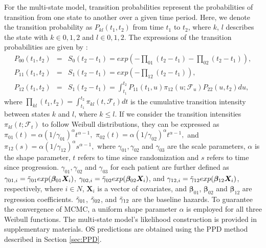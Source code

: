 \documentclass[aoas]{imsart}
\theoremstyle{plain}
\theoremstyle{remark}
\begin{document}
For the multi-state model, transition probabilities represent the probabilities of transition from one state to another over a given time period. Here, we denote the transition probability as $P_{kl}(t_1, t_2)$ from time $t_1$ to $t_2$, where $k$, $l$ describes the state with $k \in {0, 1, 2}$ and $l \in {0, 1, 2}$. The expressions of the transition probabilities are given by \citep{meira2009multi}:
\begin{eqnarray*}
P_{00}(t_1, t_2) &=& S_0(t_2 - t_1) = exp{(-\prod_{01}(t_2 - t_1) - \prod_{02}(t_2 - t_1))},\\
P_{11}(t_1, t_2) &=& S_1(t_2 - t_1) = exp{(-\prod_{12}(t_2 - t_1))},\\
P_{12}(t_1, t_2) &=& S_1(t_2 - t_1) = \int_{t_1}^{t_2}P_{11}(t_1, u) \pi_{12}(u;\mathcal{F}_u)P_{22}(u, t_2)du,
\end{eqnarray*}
where $\prod_{kl}(t_1, t_2)=\int_{t_1}^{t_2}\pi_{kl}(t, \mathcal{F}_t)dt$ is the cumulative transition intensity between states $k$ and $l$, where $k \leq l$. If we consider the transition intensities $\pi_{kl}(t; \mathcal{F}_t)$ to follow Weibull distributions, they can be expressed as
$\pi_{01}(t)=\alpha\left(1/\gamma_{01}\right)^\alpha t^{\alpha - 1},$
$\pi_{02}(t)=\alpha\left(1/\gamma_{02}\right)^\alpha t^{\alpha - 1},$
and $\pi_{12}(s)=\alpha\left(1/\gamma_{12}\right)^\alpha s^{\alpha - 1},$
where $\gamma_{01}, \gamma_{02}$ and $\gamma_{03}$ are the scale parameters, $\alpha$ is the shape parameter, $t$ refers to time since randomization and $s$ refers to time since progression. $\gamma_{01}, \gamma_{02}$ and $\gamma_{03}$ for each patient are further defined as $\gamma_{01,i} = \Tilde{\gamma}_{01}exp(\boldsymbol{\beta}_{01}\boldsymbol{X}_i)$, $\gamma_{02,i} = \Tilde{\gamma}_{02}exp(\boldsymbol{\beta}_{02}\boldsymbol{X}_i)$, and $\gamma_{12,i} = \Tilde{\gamma}_{12}exp(\boldsymbol{\beta}_{12}\boldsymbol{X}_i)$, respectively, where $i \in N$, $\boldsymbol{X}_i$ is a vector of covariates, and $\boldsymbol{\beta}_{01}$, $\boldsymbol{\beta}_{02}$ and $\boldsymbol{\beta}_{12}$ are regression coefficients. $\Tilde{\gamma}_{01}$, $\Tilde{\gamma}_{02}$, and $\Tilde{\gamma}_{12}$ are the baseline hazards. To guarantee the convergence of MCMC, a uniform shape parameter $\alpha$ is employed for all three Weibull functions. The multi-state model's likelihood construction is provided in supplementary materials. OS predictions are obtained using the PPD method described in Section \ref{sec:PPD}.
\end{document}

